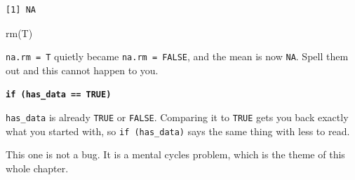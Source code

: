 \documentclass[
  letterpaper,
  justified,
  a4paper]{tufte-book}
\makeatletter
\newenvironment{Shaded}{\begin{snugshade}}{\end{snugshade}}
\newcommand{\FunctionTok}[1]{\textcolor[rgb]{0.28,0.35,0.67}{#1}}
\newcommand{\NormalTok}[1]{\textcolor[rgb]{0.00,0.23,0.31}{#1}}
\let\rbporigShaded\Shaded
\let\rbporigendShaded\endShaded
\renewenvironment{Shaded}{%
  \begingroup
  \ifdim\linewidth=\rbpbodywidth
    \advance\linewidth by \@tufte@overhang
    \advance\hsize by \@tufte@overhang
    \advance\columnwidth by \@tufte@overhang
  \fi
  \rbporigShaded
}{%
  \rbporigendShaded
  \endgroup
}
\makeatother
\begin{document}
\begin{verbatim}
[1] NA
\end{verbatim}

\begin{Shaded}
\begin{Highlighting}[]
\FunctionTok{rm}\NormalTok{(T)}
\end{Highlighting}
\end{Shaded}

\texttt{na.rm\ =\ T} quietly became \texttt{na.rm\ =\ FALSE}, and the
mean is now \texttt{NA}. Spell them out and this cannot happen to you.

\textbf{\texttt{if\ (has\_data\ ==\ TRUE)}}

\texttt{has\_data} is already \texttt{TRUE} or \texttt{FALSE}. Comparing
it to \texttt{TRUE} gets you back exactly what you started with, so
\texttt{if\ (has\_data)} says the same thing with less to read.

This one is not a bug. It is a mental cycles problem, which is the theme
of this whole chapter.
\end{document}
